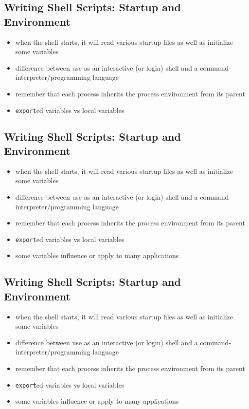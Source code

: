 \documentclass[xga]{xdvislides}
\begin{document}
\subsection{Writing Shell Scripts: Startup and Environment}
\begin{itemize}
	\item when the shell starts, it will read various startup files as
		well as initialize some variables
	\item difference between use as an interactive (or login) shell and a
		command-interpreter/programming language
	\item remember that each process inherits the process environment
		from its parent
	\item \verb+export+ed variables vs local variables
\end{itemize}

\subsection{Writing Shell Scripts: Startup and Environment}
\begin{itemize}
	\item when the shell starts, it will read various startup files as
		well as initialize some variables
	\item difference between use as an interactive (or login) shell and a
		command-interpreter/programming language
	\item remember that each process inherits the process environment
		from its parent
	\item \verb+export+ed variables vs local variables
	\item some variables influence or apply to many applications
\end{itemize}


\subsection{Writing Shell Scripts: Startup and Environment}
\begin{itemize}
	\item when the shell starts, it will read various startup files as
		well as initialize some variables
	\item difference between use as an interactive (or login) shell and a
		command-interpreter/programming language
	\item remember that each process inherits the process environment
		from its parent
	\item \verb+export+ed variables vs local variables
	\item some variables influence or apply to many applications
\end{itemize}
\end{document}
